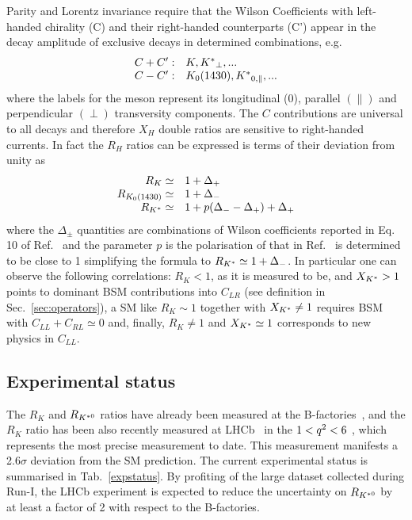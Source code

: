 Parity and Lorentz invariance require that the Wilson Coefficients with left-handed chirality (C)
and their right-handed counterparts (C') appear in the decay amplitude of exclusive decays in
determined combinations, e.g.
\begin{equation}
\begin{array}{ll}
C+C': & K, {{K}^*}_{\perp}, ...  \\
C-C': & K_0(1430), {{K}^*}_{0,\parallel}, ...
\end{array}
\end{equation}
where the labels for the \Kstar meson represent its longitudinal (0), parallel $(\parallel)$ and
perpendicular $(\perp)$ transversity components. The $C$ contributions are universal to
all decays and therefore $X_H$ double ratios are sensitive to right-handed currents.
In fact the $R_H$ ratios can be expressed is terms of their deviation from unity as
\begin{equation}
\begin{array}{rl}
R_K \simeq 			& 1+ \Delta_+ 		\\
R_{K_0(1430)} \simeq 	& 1+ \Delta_-		\\
R_{{K}^*} \simeq 		& 1+ p(\Delta_- - \Delta_+) + \Delta_+
\end{array}
\end{equation}
where the $\Delta_\pm$ quantities are combinations of Wilson coefficients
reported in Eq. 10 of Ref.~\cite{Hiller:2014ula} and the parameter $p$ is the polarisation of \Kstar
that in Ref.~\cite{Hiller:2014ula} is determined to be close to 1 simplifying the formula to $R_{{K}^*} \simeq 1+ \Delta_-$.
In particular one can observe the following correlations: $R_K < 1$, as it is measured to be, and $X_{{{K}^*}} > 1$
points to dominant BSM contributions into $C_{LR}$ (see definition in Sec.~\ref{sec:operators}),
a SM like $R_K \sim 1$ together with $X_{{{K}^*}} \neq 1$ requires BSM with $C_{LL} + C_{RL} \simeq 0$
and, finally, $R_K \neq 1$ and $X_{{{K}^*}} \simeq 1$ corresponds to new physics in $C_{LL}$.

\subsection{Experimental status}

The $R_K$ and $R_{{{K}^{*0}}}$ ratios have already been measured at the B-factories~\cite{Lees:2012tva,Wei:2009zv},
and the $R_K$ ratio has been also recently measured at LHCb~\cite{LHCb-PAPER-2014-024} in the $1 < {q^2} < 6$ \gevgevcccc,
which represents the most precise measurement to date. This measurement manifests a 2.6$\sigma$
deviation from the SM prediction. 
The current experimental status is summarised in Tab.~\ref{expstatus}. By profiting of the large dataset collected during Run-I, the LHCb experiment is expected
to reduce the uncertainty on $R_{{{K}^{*0}}}$ by at least a factor of 2 with respect to the B-factories.

